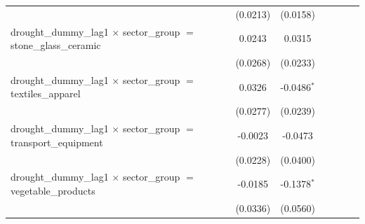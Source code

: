 \begin{tabular}{lcccccccc}
                                                                                  &                       &                       & (0.0213)              & (0.0158)              &                       &                       &                       &   \\   
   drought\_dummy\_lag1 $\times$ sector\_group $=$ stone\_glass\_ceramic          &                       &                       & 0.0243                & 0.0315                &                       &                       &                       &   \\   
                                                                                  &                       &                       & (0.0268)              & (0.0233)              &                       &                       &                       &   \\   
   drought\_dummy\_lag1 $\times$ sector\_group $=$ textiles\_apparel              &                       &                       & 0.0326                & -0.0486$^{*}$         &                       &                       &                       &   \\   
                                                                                  &                       &                       & (0.0277)              & (0.0239)              &                       &                       &                       &   \\   
   drought\_dummy\_lag1 $\times$ sector\_group $=$ transport\_equipment           &                       &                       & -0.0023               & -0.0473               &                       &                       &                       &   \\   
                                                                                  &                       &                       & (0.0228)              & (0.0400)              &                       &                       &                       &   \\   
   drought\_dummy\_lag1 $\times$ sector\_group $=$ vegetable\_products            &                       &                       & -0.0185               & -0.1378$^{*}$         &                       &                       &                       &   \\   
                                                                                  &                       &                       & (0.0336)              & (0.0560)              &                       &                       &                       &   \\   

\end{tabular}
